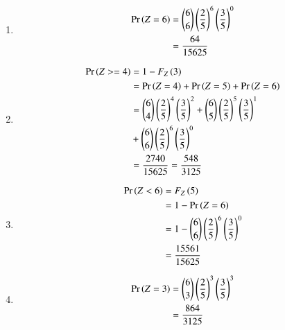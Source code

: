 \documentclass[journal,12pt,twocolumn]{IEEEtran}
\begin{document}
\begin{enumerate}
	\item 
	\begin{align}
		\Pr\left(Z = 6\right) &= \binom{6}{6}\left(\frac{2}{5}\right)^6\left(\frac{3}{5}\right)^{0}
		\\&= \frac{64}{15625} 
	\end{align}
	
	
	\item 
	\begin{align}
		\Pr\left(Z>=4\right) &=1-F_Z\left(3\right)
		\\&= \Pr\left(Z = 4\right)+\Pr\left(Z=5\right)+\Pr\left(Z = 6\right) \\&= 
		\binom{6}{4}\left(\frac{2}{5}\right)^4\left(\frac{3}{5}\right)^2
		+\binom{6}{5}\left(\frac{2}{5}\right)^5\left(\frac{3}{5}\right)^1
		\\&+\binom{6}{6}\left(\frac{2}{5}\right)^6\left(\frac{3}{5}\right)^0\nonumber
		\\&= \frac{2740}{15625} =\frac{548}{3125} 
	\end{align}
	
	\item 
	\begin{align}
		\Pr\left(Z < 6\right) &= F_Z\left(5\right) 
		\\&= 1-\Pr\left(Z = 6\right) \\&= 1 - \binom{6}{6}\left(\frac{2}{5}\right)^6\left(\frac{3}{5}\right)^0
		\\&= \frac{15561}{15625}  
	\end{align}
	
	\item 
	\begin{align}
		\Pr\left(Z = 3\right) &= \binom{6}{3}\left(\frac{2}{5}\right)^3\left(\frac{3}{5}\right)^3 
		\\&= \frac{864}{3125} 
	\end{align}
\end{enumerate}
\end{document}
